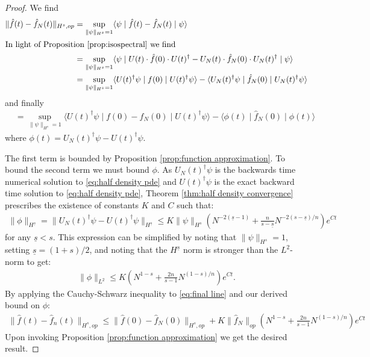 \documentclass[final,leqno]{siamltex1213}
\begin{document}
\begin{proof}
	We find
	\begin{align}
		\| \hat{f}(t) - \hat{f}_{N}(t) \|_{H^{s},op} &= \sup_{\| \psi \|_{H^{s}} =1} \langle \psi \mid \hat{f}(t) - \hat{f}_{N}(t) \mid \psi \rangle \\
	\intertext{In light of Proposition \ref{prop:isospectral} we find}
			&= \sup_{ \| \psi \|_{H^{s}} =1} \langle \psi \mid U(t) \cdot \hat{f}(0) \cdot U(t)^{\dagger} - U_{N}(t) \cdot \hat{f}_{N}(0) \cdot U_{N}(t)^{\dagger} \mid \psi \rangle \\
			&= \sup_{ \| \psi \|_{H^{s}} =1 } \langle U(t)^{\dagger} \psi \mid f(0) \mid U(t)^{\dagger} \psi \rangle 
				- \langle U_{N}(t)^{\dagger} \psi \mid \hat{f}_{N}(0) \mid U_{N}(t)^{\dagger} \psi \rangle
	\end{align}
	and finally
	\begin{align}
			&= \sup_{ \| \psi \|_{H^{s}} = 1} \langle U(t)^{\dagger} \psi \mid f(0) - f_{N}(0) \mid U(t)^{\dagger} \psi \rangle 
			- \langle  \phi(t) \mid \hat{f}_{N}(0) \mid  \phi(t) \rangle \label{eq:final line}
	\end{align}
	where $\phi(t) = U_{N}(t)^{\dagger} \psi - U(t)^{\dagger} \psi$.
	
	The first term is bounded by Proposition \ref{prop:function approximation}.
	To bound the second term we must bound $\phi$.
	As $U_{N}(t)^{\dagger} \psi$ is the backwards time numerical solution to \eqref{eq:half density pde} and $U(t)^{\dagger}\psi$ is the exact backward time solution to \eqref{eq:half density pde},
	Theorem \ref{thm:half density convergence} prescribes the existence of constants $K$ and $C$ such that:
	\begin{align}
		\| \phi \|_{H^{\underline{s}}} = \| U_{N}(t)^{\dagger} \psi - U(t)^{\dagger} \psi \|_{H^{\underline{s}}}  \leq K \| \psi \|_{H^{s}} \left(  N^{-2(\underline{s}-1)} + \frac{n}{s - \underline{s}} N^{-2(s-\underline{s})/n} \right) e^{Ct} 
	\end{align}
	for any $\underline{s} <s$.
	This expression can be simplified by noting that $\| \psi \|_{H^{s}} = 1$, setting $\underline{s} = (1+s)/2$, and noting that the $H^{\underline{s}}$ norm is stronger than the $L^{2}$-norm to get:
	\begin{align}
		 \| \phi \|_{L^{2}}  \leq  K \left(  N^{1-s} + \frac{2n}{s -1} N^{(1-s)/n} \right) e^{Ct}.
	\end{align}
	By applying the Cauchy-Schwarz inequality to \eqref{eq:final line} and our derived bound on $\phi$:
	\begin{align}
		\| \hat{f}(t) - \hat{f}_{n}(t) \|_{H^{s},op} \leq \| \hat{f}(0) - \hat{f}_{N}(0) \|_{H^{s},op} +  K \| \hat{f}_{N} \|_{op} \left( N^{1-s} + \frac{2n}{s -1} N^{(1-s)/n} \right) e^{Ct}
	\end{align}
	Upon invoking Proposition \ref{prop:function approximation} we get the desired result.
\end{proof}
\end{document}
